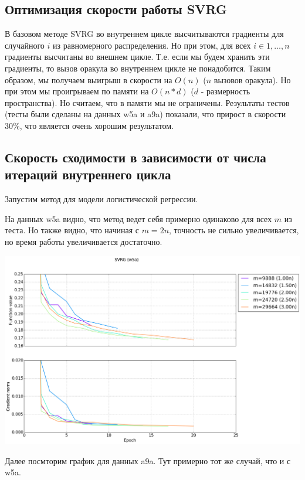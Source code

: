 \documentclass[12pt, a4paper]{article}
\begin{document}
    \subsection{Оптимизация скорости работы SVRG}
    В базовом методе SVRG во внутреннем цикле высчитываются градиенты для случайного $i$ из равномерного распределения. Но при этом, для всех $i \in {1, \dots, n}$ градиенты
    высчитаны во внешнем цикле. Т.е. если мы будем хранить эти градиенты, то вызов оракула во внутреннем цикле не понадобится. Таким образом, мы получаем выигрыш в скорости
    на $O(n)$ ($n$ вызовов оракула). Но при этом мы проигрываем по памяти на $O(n * d)$ ($d$ - размерность пространства). Но считаем, что в памяти мы не ограничены. Результаты
    тестов (тесты были сделаны на данных w5a и a9a) показали, что прирост в скорости 30\%, что является очень хорошим результатом.

    \subsection{Скорость сходимости в зависимости от числа итераций внутреннего цикла}
    Запустим метод для модели логистической регрессии.

    На данных w5a видно, что метод ведет себя примерно одинаково для всех $m$ из теста. Но также видно, что начиная с $m = 2n$, точность не сильно увеличивается,
    но время работы увеличивается достаточно.

    \def \picwidth {17cm}

    \begin{center}\includegraphics[width=\picwidth]{svrg_w5a_zoomed.png}\end{center}

    Далее посмторим график для данных a9a. Тут примерно тот же случай, что и с w5a.
\end{document}
